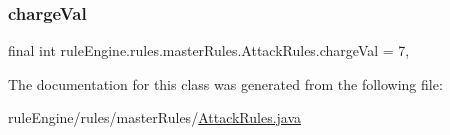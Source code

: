 \subsubsection{\texorpdfstring{charge\+Val}{chargeVal}}
{\footnotesize\ttfamily final int rule\+Engine.\+rules.\+master\+Rules.\+Attack\+Rules.\+charge\+Val = 7\hspace{0.3cm}{\ttfamily [static]}, {\ttfamily [private]}}



The documentation for this class was generated from the following file\+:\begin{DoxyCompactItemize}
\item 
rule\+Engine/rules/master\+Rules/\mbox{\hyperlink{_attack_rules_8java}{Attack\+Rules.\+java}}\end{DoxyCompactItemize}
